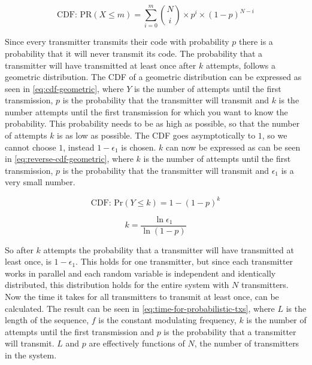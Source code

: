 \begin{equation}
	\label{eq:cdf-binomial}
	\text{CDF:  PR}(X \le m) = \displaystyle\sum_{i=0}^{m} \binom Ni \times p^i \times (1 - p)^{N-i}
\end{equation}




Since every transmitter transmits their code with probability $p$ there is a probability that it will never transmit its code.
The probability that a transmitter will have transmitted at least once after $k$ attempts, follows a geometric distribution.
The CDF of a geometric distribution can be expressed as seen in \autoref{eq:cdf-geometric}, where $Y$ is the number of attempts until the first transmission, $p$ is the probability that the transmitter will transmit and $k$ is the number attempts until the first transmission for which you want to know the probability.
This probability needs to be as high as possible, so that the number of attempts $k$ is as low as possible.
The CDF goes asymptotically to $1$, so we cannot choose $1$, instead $1 - \epsilon_1$ is chosen.
$k$ can now be expressed as can be seen in \autoref{eq:reverse-cdf-geometric}, where $k$ is the number of attempts until the first transmission, $p$ is the probability that the transmitter will transmit and $\epsilon_1$ is a very small number.

\begin{equation}
	\label{eq:cdf-geometric}
	\text{CDF:  Pr}(Y \le k) = 1 - (1 - p)^k
\end{equation}

\begin{equation}
	\label{eq:reverse-cdf-geometric}
	k = \frac{\ln\epsilon_1}{\ln(1 - p)}
\end{equation}

So after $k$ attempts the probability that a transmitter will have transmitted at least once, is $1 - \epsilon_1$.
This holds for one transmitter, but since each transmitter works in parallel and each random variable is independent and identically distributed, this distribution holds for the entire system with $N$ transmitters.
Now the time it takes for all transmitters to transmit at least once, can be calculated.
The result can be seen in \autoref{eq:time-for-probabilistic-txs}, where $L$ is the length of the sequence, $f$ is the constant modulating frequency, $k$ is the number of attempts until the first transmission and $p$ is the probability that a transmitter will transmit.
$L$ and $p$ are effectively functions of $N$, the number of transmitters in the system.

